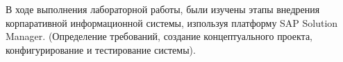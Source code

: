 \Conclusion %

В ходе выполнения лабораторной работы, были изучены этапы внедрения
корпаративной информационной системы, изпользуя платформу SAP Solution Manager.
(Определение требований, создание концептуального проекта, конфигурирование и
тестирование системы).



